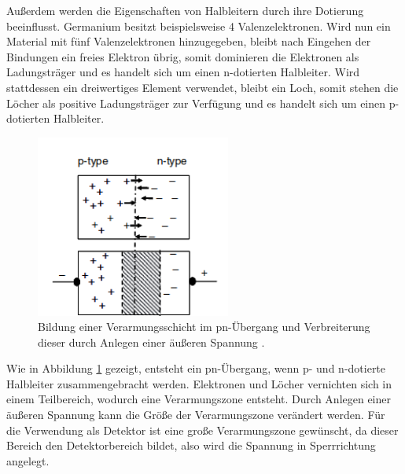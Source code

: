 Außerdem werden die Eigenschaften von Halbleitern durch ihre Dotierung beeinflusst. Germanium besitzt
beispielsweise 4 Valenzelektronen. Wird nun ein Material mit fünf Valenzelektronen hinzugegeben, bleibt nach
Eingehen der Bindungen ein freies Elektron übrig, somit dominieren die Elektronen als Ladungsträger und es handelt
sich um einen n-dotierten Halbleiter.
Wird stattdessen ein dreiwertiges Element verwendet, bleibt ein Loch, somit stehen die Löcher als
positive Ladungsträger zur Verfügung und es handelt sich um einen p-dotierten Halbleiter.\\

\begin{figure}[H]
  \centering
  \includegraphics[height=6cm]{pn.png}
  \caption{Bildung einer Verarmungsschicht im pn-Übergang und Verbreiterung dieser durch
  Anlegen einer äußeren Spannung \cite{Gilmore2}.}
  \label{fig:pn}
\end{figure}

Wie in Abbildung \ref{fig:pn} gezeigt, entsteht ein pn-Übergang, wenn p- und n-dotierte Halbleiter zusammengebracht werden.
Elektronen und Löcher vernichten sich in einem Teilbereich, wodurch eine Verarmungszone entsteht.
Durch Anlegen einer äußeren Spannung kann die Größe der Verarmungszone verändert werden. Für die
Verwendung als Detektor ist eine große Verarmungszone gewünscht, da dieser Bereich den
Detektorbereich bildet, also wird die Spannung in Sperrrichtung angelegt.


